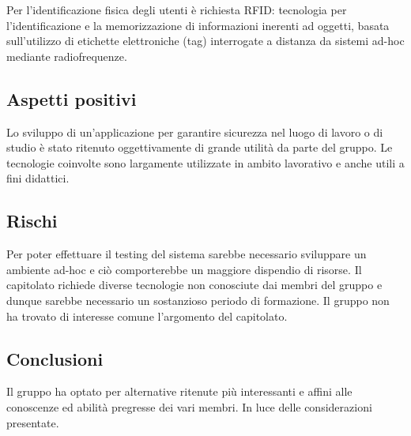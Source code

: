 \documentclass[../studio-di-fattibilita.tex]{subfiles}
\begin{document}
Per l’identificazione fisica degli utenti è richiesta RFID: tecnologia per l’identificazione e la memorizzazione di informazioni inerenti ad oggetti, basata sull’utilizzo di etichette elettroniche (tag) interrogate a distanza da sistemi ad-hoc mediante radiofrequenze.

\subsection{Aspetti positivi}%
\label{sub:aspetti_positivi}
Lo sviluppo di un’applicazione per garantire sicurezza nel luogo di lavoro o di studio è stato ritenuto oggettivamente di grande utilità da parte del gruppo.
Le tecnologie coinvolte sono largamente utilizzate in ambito lavorativo e anche utili a fini didattici.


\subsection{Rischi}%
\label{sub:rischi}
Per poter effettuare il testing del sistema sarebbe necessario sviluppare un ambiente ad-hoc e ciò comporterebbe un maggiore dispendio di risorse.
Il capitolato richiede diverse tecnologie non conosciute dai membri del gruppo e dunque sarebbe necessario un sostanzioso periodo di formazione.
Il gruppo non ha trovato di interesse comune l’argomento del capitolato.

\subsection{Conclusioni}%
\label{sub:Conclusioni}
Il gruppo ha optato per alternative ritenute più interessanti e affini alle conoscenze ed abilità pregresse dei vari membri. In luce delle considerazioni presentate.
\end{document}
